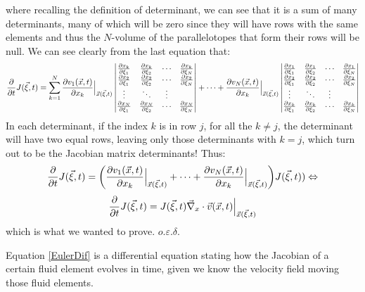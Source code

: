\documentclass[11pt, a4paper]{article} %
\begin{document}
where recalling the definition of determinant, we can see that it is a sum of many determinants, many of which will be zero since they will have rows with the same elements and thus the $N$-volume of the parallelotopes that form their rows will be null. We can see clearly from the last equation that:
\begin{equation}
\pdv{}{t}J(\vec{\xi},t)=\sum_{k=1}^N \pdv{v_1(\vec{x},t)}{x_k}\Big\rvert_{\vec{x}(\vec{\xi},t)} \begin{vmatrix}
\pdv{x_k}{\xi_{1}}&\pdv{x_k}{\xi_{2}} &\cdots &\pdv{x_k}{\xi_{N}}\\
\pdv{x_2}{\xi_{1}}&\pdv{x_2}{\xi_{2}} &\cdots &\pdv{x_2}{\xi_{N}}\\
\vdots & \ddots & \vdots\\
\pdv{x_N}{\xi_{1}}&\pdv{x_N}{\xi_{2}} &\cdots &\pdv{x_N}{\xi_{N}}
\end{vmatrix}+\cdots+
\pdv{v_N(\vec{x},t)}{x_k}\Big\rvert_{\vec{x}(\vec{\xi},t)} \begin{vmatrix}
\pdv{x_1}{\xi_{1}}&\pdv{x_1}{\xi_{2}} &\cdots &\pdv{x_1}{\xi_{N}}\\
\pdv{x_2}{\xi_{1}}&\pdv{x_2}{\xi_{2}} &\cdots &\pdv{x_2}{\xi_{N}}\\
\vdots & \ddots & \vdots\\
\pdv{x_k}{\xi_{1}}&\pdv{x_k}{\xi_{2}} &\cdots &\pdv{x_k}{\xi_{N}}
\end{vmatrix}
\end{equation}
In each determinant, if the index $k$ is in row $j$, for all the $k\neq j$, the determinant will have two equal rows, leaving only those determinants with $k=j$, which turn out to be the Jacobian matrix determinants! Thus:
\begin{equation}
\pdv{}{t}J(\vec{\xi},t)=\qty(\pdv{v_1(\vec{x},t)}{x_k}\Big\rvert_{\vec{x}(\vec{\xi},t)}+\cdots+\pdv{v_N(\vec{x},t)}{x_k}\Big\rvert_{\vec{x}(\vec{\xi},t)}) J(\vec{\xi},t))\Leftrightarrow
\end{equation}
\begin{equation}\label{EulerDif}
\pdv{}{t}J(\vec{\xi},t)=J(\vec{\xi},t)\vec{\nabla}_x\cdot\vec{v}(\vec{x},t)\Big\rvert_{\vec{x}(\vec{\xi},t)}
\end{equation}
which is what we wanted to prove. $o.\varepsilon.\delta$.

Equation \eqref{EulerDif} is a differential equation stating how the Jacobian of a certain fluid element evolves in time, given we know the velocity field moving those fluid elements.
\end{document}
